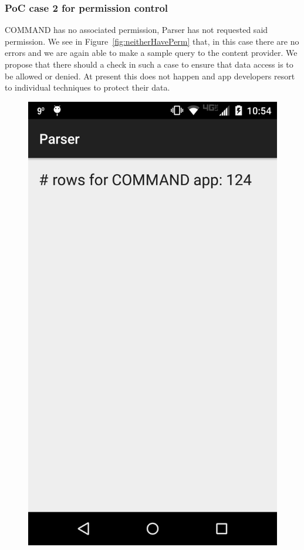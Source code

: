 \subsubsection{PoC case 2 for permission control} COMMAND has no associated permission, Parser has not requested said permission. We see in Figure~\ref{fig:neitherHavePerm} that, in this case there are no errors and we are again able to make a sample query to the content provider. We propose that there should a check in such a case to ensure that data access is to be allowed or denied. At present this does not happen and app developers resort to individual techniques to protect their data.
\begin{figure}
\centering
\begin{minipage}{.45\columnwidth}
	\includegraphics[width=\columnwidth,scale=0.5]{images/bothHavePerm}

\end{minipage}
\end{figure}
